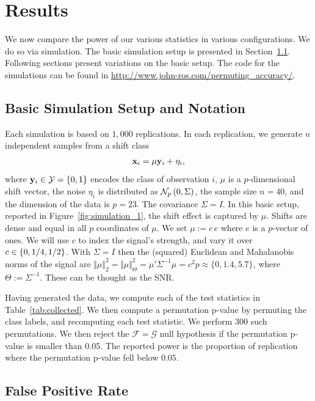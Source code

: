 \documentclass[]{bio}
\begin{document}
\section{Results}
\label{sec:results}
We now compare the power of our various statistics in various configurations. 
We do so via simulation.
The basic simulation setup is presented in Section~\ref{sec:simulation_details}.
Following sections present variations on the basic setup.
The \R code for the simulations can be found in \url{http://www.john-ros.com/permuting_accuracy/}.


\subsection{Basic Simulation Setup and Notation}
\label{sec:simulation_details}

Each simulation is based on $1,000$ replications. 
In each replication, we generate $n$ independent samples from a shift class 
\begin{align}
\label{eq:distribution}
\mathbf{x}_i = \mu \mathbf{y}_i + \eta_i,
\end{align}
where $\mathbf{y}_i \in \mathcal{Y}=\{ 0,1 \}$ encodes the class of observation $i$, $\mu$ is a $p$-dimensional shift vector, the noise $\eta_i$ is distributed as $\mathcal{N}_{p}\left(0,\Sigma\right)$, the sample size $n=40$, and the dimension of the data is $p=23$. 
The covariance $\Sigma=I$. 
In this basic setup, reported in Figure~\ref{fig:simulation_1}, the shift effect is captured by $\mu$. 
Shifts are dense and equal in all $p$ coordinates of $\mu$.
We set $\mu:=c \, e$ where $e$ is a $p$-vector of ones. 
We will use $c$ to index the signal's strength, and vary it over $c \in \{ 0,1/4,1/2 \}$.
With $\Sigma=I$ then the (squared) Euclidean and Mahalanobis norms of the signal are $\Vert \mu \Vert_2^2=\Vert \mu \Vert_\Theta^2=\mu' \Sigma^{-1} \mu= c^2 p\approx \{0,1.4,5.7\}$, where $\Theta:=\Sigma^{-1}$. 
These can be thought as the SNR. 


Having generated the data, we compute each of the test statistics in Table~\ref{tab:collected}.
We then compute a permutation p-value by permuting the class labels, and recomputing each test statistic. 
We perform $300$ such permutations. 
We then reject the $\mathcal{F}=\mathcal{G}$ null hypothesis if the permutation p-value is smaller than $0.05$.
The reported power is the proportion of replication where the permutation p-value fell below $0.05$.



\subsection{False Positive Rate}
\label{sec:type_i}
\end{document}
